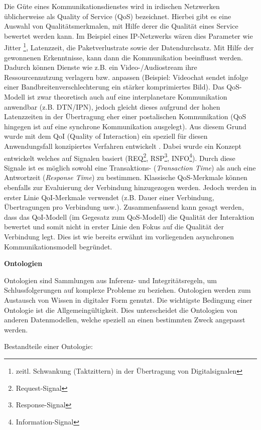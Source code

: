 Die G{\"u}te eines Kommunikationsdienstes wird in irdischen Netzwerken
{\"u}blicherweise als Quality of Service (QoS) bezeichnet. Hierbei gibt es eine
Auswahl von Qualit{\"a}tsmerkmalen, mit Hilfe derer die Qualit{\"a}t eines
Service bewertet werden kann. Im Beispiel eines IP-Netzwerks w{\"a}ren dies
Parameter wie Jitter \footnote{zeitl. Schwankung (Taktzittern) in der
{\"U}bertragung von Digitalsignalen}, Latenzzeit, die Paketverlustrate sowie der
Datendurchsatz. Mit Hilfe der gewonnenen Erkenntnisse, kann dann die
Kommunikation beeinflusst werden. Dadurch k{\"o}nnen Dienste wie z.B. ein
Video-/Audiostream ihre Ressourcennutzung verlagern bzw. anpassen
(Beispiel: Videochat sendet infolge einer Bandbreitenverschlechterung ein
st{\"a}rker komprimiertes Bild). Das QoS-Modell ist zwar theoretisch auch auf
eine interplanetare Kommunikation anwendbar (z.B. DTN/IPN), jedoch gleicht
dieses aufgrund der hohen Latenzzeiten in der {\"U}bertragung eher einer
postalischen Kommunikation (QoS hingegen ist auf eine synchrone Kommunikation
ausgelegt). Aus diesem Grund wurde mit dem QoI (Quality of Interaction) ein
speziell f{\"u}r diesen Anwendungsfall konzipiertes Verfahren entwickelt
\cite{Daher2}. Dabei wurde ein Konzept entwickelt welches auf Signalen basiert
(REQ\footnote{Request-Signal}, RSP\footnote{Response-Signal},
INFO\footnote{Information-Signal}). Durch diese Signale ist es m{\"o}glich
sowohl eine Transaktions- (\textit{Transaction Time}) als auch eine Antwortzeit
(\textit{Response Time}) zu bestimmen. Klassische QoS-Merkmale k{\"o}nnen
ebenfalls zur Evaluierung der Verbindung hinzugezogen werden. Jedoch werden in
erster Linie QoI-Merkmale verwendet (z.B. Dauer einer Verbindung,
{\"U}bertragungen pro Verbindung usw.). Zusammenfassend kann gesagt werden, dass
das QoI-Modell (im Gegesatz zum QoS-Modell) die Qualit{\"a}t der
Interaktion bewertet und somit nicht in erster Linie den Fokus auf die
Qualit{\"a}t der Verbindung legt. Dies ist wie bereits erw{\"a}hnt im
vorliegenden asynchronen Kommunikationsmodell begr{\"u}ndet.

\textbf{Ontologien}

Ontologien sind Sammlungen aus Inferenz- und Integrit{\"a}tsregeln, um
Schlussfolgerungen auf komplexe Probleme zu beziehen. Ontologien werden zum
Austausch von Wissen in digitaler Form genutzt. Die wichtigste Bedingung einer
Ontologie ist die Allgemeing{\"u}ltigkeit. Dies unterscheidet die Ontologien von
anderen Datenmodellen, welche speziell an einen bestimmten Zweck angepasst
werden.

Bestandteile einer Ontologie:

